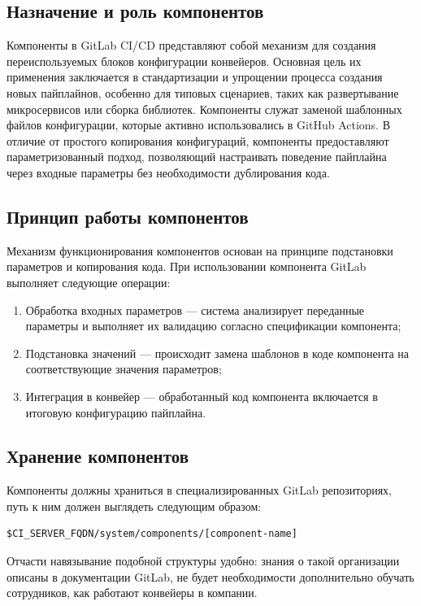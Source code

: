 \subsection{Назначение и роль компонентов} \label{subsec:components-role}
Компоненты в GitLab CI/CD\cite{gl-components} представляют собой механизм для создания переиспользуемых блоков конфигурации конвейеров.
Основная цель их применения заключается в стандартизации и упрощении процесса создания новых пайплайнов,
особенно для типовых сценариев, таких как развертывание микросервисов или сборка библиотек.
Компоненты служат заменой шаблонных файлов конфигурации, которые активно использовались в GitHub Actions.
В отличие от простого копирования конфигураций, компоненты предоставляют параметризованный подход,
позволяющий настраивать поведение пайплайна через входные параметры без необходимости дублирования кода.

\subsection{Принцип работы компонентов} \label{subsec:components-work-principals}
Механизм функционирования компонентов основан на принципе подстановки параметров и копирования кода.
При использовании компонента GitLab выполняет следующие операции:
\begin{enumerate}
  \item Обработка входных параметров — система анализирует переданные параметры и выполняет их валидацию согласно спецификации компонента;
  \item Подстановка значений — происходит замена шаблонов в коде компонента на соответствующие значения параметров;
  \item Интеграция в конвейер — обработанный код компонента включается в итоговую конфигурацию пайплайна.
\end{enumerate}

\subsection{Хранение компонентов} \label{subsec:components-storage}
Компоненты должны храниться в специализированных GitLab репозиториях, путь к ним должен выглядеть следующим образом:
\begin{verbatim}
$CI_SERVER_FQDN/system/components/[component-name]
\end{verbatim}

Отчасти навязывание подобной структуры удобно: знания о такой организации описаны в документации GitLab,
не будет необходимости дополнительно обучать сотрудников, как работают конвейеры в компании.

